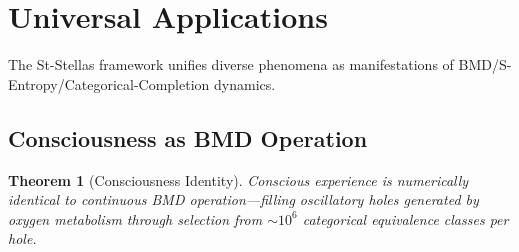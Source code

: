 \documentclass[12pt,a4paper]{article}
\newtheorem{theorem}{Theorem}[section]
\begin{document}
\section{Universal Applications}

The St-Stellas framework unifies diverse phenomena as manifestations of BMD/S-Entropy/Categorical-Completion dynamics.

\subsection{Consciousness as BMD Operation}

\begin{theorem}[Consciousness Identity]
\label{thm:consciousness_identity}
Conscious experience is numerically identical to continuous BMD operation—filling oscillatory holes generated by oxygen metabolism through selection from $\sim 10^6$ categorical equivalence classes per hole.
\end{theorem}
\end{document}
